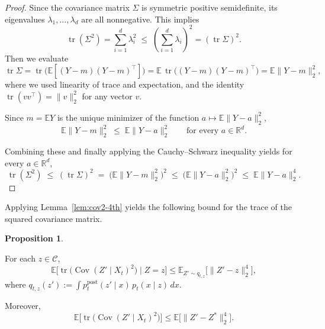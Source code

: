 \documentclass[11pt]{article}
\theoremstyle{definition}
\newtheorem{proposition}{Proposition}
\newcommand{\Cov}{\operatorname{Cov}}
\numberwithin{equation}{section}
\begin{document}
\begin{proof}
Since the covariance matrix $\Sigma$ is symmetric 
positive semidefinite, its eigenvalues $\lambda_1,\dots,\lambda_d$ 
are all nonnegative. This implies
\[
\operatorname{tr}(\Sigma^2)=\sum_{i=1}^d \lambda_i^2 
\;\le\; \left(\sum_{i=1}^d \lambda_i\right)^2 
= (\operatorname{tr}\Sigma)^2.
\]
Then we evaluate
\[
\operatorname{tr}\Sigma 
= \operatorname{tr}\bigl(\mathbb{E}[(Y-m)(Y-m)^\top]\bigr)
= \mathbb{E}\,\operatorname{tr}\bigl((Y-m)(Y-m)^\top\bigr)
= \mathbb{E}\|Y-m\|_2^2,
\]
where we used linearity of trace and expectation, and the identity 
$\operatorname{tr}(vv^\top)=\|v\|_2^2$ for any vector $v$.

Since $m=\mathbb{E}Y$ is the unique minimizer of 
the function $a\mapsto \mathbb{E}\|Y-a\|_2^2$, 
\[
\mathbb{E}\|Y-m\|_2^2 
\;\le\; \mathbb{E}\|Y-a\|_2^2
\qquad\text{for every } a\in\mathbb{R}^d.
\]

Combining these and finally applying the Cauchy--Schwarz 
inequality yields for every $a\in\mathbb{R}^d$, 
\[
\operatorname{tr}(\Sigma^2)
\;\le\;
(\operatorname{tr}\Sigma)^2
\;=\;
\bigl(\mathbb{E}\|Y-m\|_2^2\bigr)^2
\;\le\;
\bigl(\mathbb{E}\|Y-a\|_2^2\bigr)^2
\;\le\;
\mathbb{E}\|Y-a\|_2^4.
\]
\end{proof}

Applying Lemma~\ref{lem:cov2-4th} yields the following bound for the trace of the squared covariance matrix.

\begin{proposition}
\label{prop:cond-typical}

For each \(z \in \mathcal{C}\),
\[
\mathbb{E}\bigl[ \operatorname{tr}\bigl( \Cov(Z' \mid X_t)^2 \bigr) \mid Z = z \bigr]
\le \mathbb{E}_{Z' \sim q_{t,z}} \bigl[ \|Z' - z\|_2^4 \bigr],
\]
where \(q_{t,z}(z') := \int p^{\mathrm{post}}_t(z' \mid x)\, p_t(x \mid z)\, dx\).

Moreover, 
\[
\mathbb{E}\bigl[ \operatorname{tr}\bigl( \Cov(Z' \mid X_t)^2 \bigr) \bigr]
\le \mathbb{E}\bigl[ \|Z' - Z^*\|_2^4 \bigr].
\]
\end{proposition}
\end{document}
